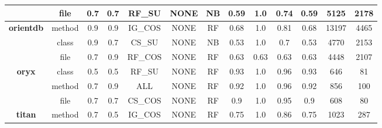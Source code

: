 \begin{table}[H]
{\begin{tabular}{@{}ccccccccccccc@{}}
                                                         & file                   & 0.7        & 0.7           & RF\_SU                   & NONE                       & NB             & 0.59               & 1.0             & 0.74       & 0.59              & 5125               & 2178          \\
                                                         \hline
\multirow{3}{*}{\textbf{orientdb}}                       & method                 & 0.9        & 0.9           & IG\_COS                  & NONE                       & RF             & 0.68               & 1.0             & 0.81       & 0.68              & 13197              & 4465          \\
                                                         & class                  & 0.9        & 0.7           & CS\_SU                   & NONE                       & NB             & 0.53               & 1.0             & 0.7        & 0.53              & 4770               & 2153          \\
                                                         & file                   & 0.7        & 0.9           & RF\_COS                  & NONE                       & RF             & 0.63               & 0.63            & 0.63       & 0.63              & 4448               & 2107          \\
                                                         \hline
\multirow{3}{*}{\textbf{oryx}}                           & class                  & 0.5        & 0.5           & RF\_SU                   & NONE                       & RF             & 0.93               & 1.0             & 0.96       & 0.93              & 646                & 81            \\
                                                         & method                 & 0.7        & 0.9           & ALL                      & NONE                       & RF             & 0.92               & 1.0             & 0.96       & 0.92              & 856                & 100           \\
                                                         & file                   & 0.7        & 0.7           & CS\_COS                  & NONE                       & RF             & 0.9                & 1.0             & 0.95       & 0.9               & 608                & 80            \\
                                                         \hline
\multirow{3}{*}{\textbf{titan}}                          & method                 & 0.7        & 0.5           & IG\_COS                  & NONE                       & RF             & 0.75               & 1.0             & 0.86       & 0.75              & 1023               & 287           \\

\end{tabular}}
\end{table}
